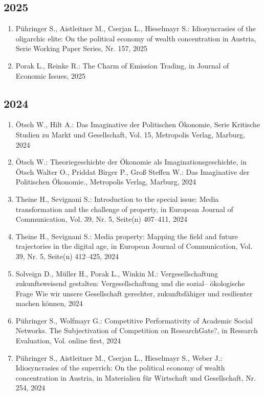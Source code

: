 \subsection*{2025}
\begin{enumerate}
    	 \item Pühringer S., Aistleitner M., Cserjan L., Hieselmayr S.: Idiosyncrasies of the oligarchic elite: On the political economy of wealth concentration in Austria, Serie Working Paper Series, Nr. 157, 2025
	 \item Porak L., Reinke R.: The Charm of Emission Trading, in Journal of Economic Issues, 2025
\end{enumerate}
\subsection*{2024}
\begin{enumerate}
    	 \item Ötsch W., Hilt A.: Das Imaginative der Politischen Ökonomie, Serie Kritische Studien zu Markt und Gesellschaft, Vol. 15, Metropolis Verlag, Marburg, 2024
	 \item Ötsch W.: Theoriegeschichte der Ökonomie als Imaginationsgeschichte, in Ötsch Walter O., Priddat Birger P., Groß Steffen W.: Das Imaginative der Politischen Ökonomie., Metropolis Verlag, Marburg, 2024
	 \item Theine H., Sevignani S.: Introduction to the special issue: Media transformation and the challenge of property, in European Journal of Communication, Vol. 39, Nr. 5, Seite(n) 407–411, 2024
	 \item Theine H., Sevignani S.: Media property: Mapping the field and future trajectories in the digital age, in European Journal of Communication, Vol. 39, Nr. 5, Seite(n) 412–425, 2024
	 \item Solveign D., Müller H., Porak L., Winkin M.: Vergesellschaftung zukunftsweisend gestalten: Vergesellschaftung und die sozial-- ökologische Frage Wie wir unsere Gesellschaft gerechter, zukunftsfähiger und resilienter machen können, 2024
	 \item Pühringer S., Wolfmayr G.: Competitive Performativity of Academic Social Networks. The Subjectivation of Competition on ResearchGate?, in Research Evaluation, Vol. online first, 2024
	 \item Pühringer S., Aistleitner M., Cserjan L., Hieselmayr S., Weber J.: Idiosyncrasies of the superrich: On the political economy of wealth concentration in Austria, in Materialien für Wirtschaft und Gesellschaft, Nr. 254, 2024

\end{enumerate}
